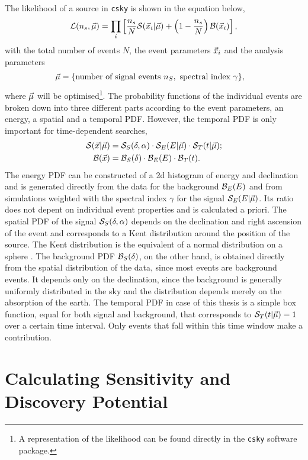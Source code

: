 The likelihood of a source in \texttt{csky} is shown in the equation below,
\begin{equation}
  \mathcal{L}(n_s,\vec{\mu})
  = \prod_i \left[ 
    \frac{n_s}{N} \mathcal{S}(\vec{x}_i|\vec{\mu})
    + \left( 1 - \frac{n_s}{N} \right) \mathcal{B}(\vec{x}_i)
   \right],
  \label{eq:lh}
\end{equation}
with the total number of events $N$, the event parameters $\vec{x}_i$ and the analysis parameters
\begin{align}
  \vec{\mu} &= \{\text{number of signal events }n_S, \text{ spectral index }\gamma\},
\end{align}
where $\vec{\mu}$ will be optimised\footnote{A representation of the likelihood can be found directly in the \texttt{csky} software package.}.
The probability functions of the individual events are broken down into three different parts according to the event parameters, an energy, a spatial and a temporal PDF.
However, the temporal PDF is only important for time-dependent searches,
\begin{align}
  \mathcal{S}(\vec{x}|\vec{\mu})
  &= \mathcal{S}_S(\delta,\alpha)
  \cdot \mathcal{S}_E(E|\vec{\mu})
  \cdot \mathcal{S}_T(t|\vec{\mu});
  \\
  \mathcal{B}(\vec{x})
  &= \mathcal{B}_S(\delta)
  \cdot \mathcal{B}_E(E)
  \cdot \mathcal{B}_T(t).
  \label{eq:pdf}
\end{align}
The energy PDF can be constructed of a 2d histogram of energy and declination and is generated directly from the data for the background $\mathcal{B}_E(E)$ and from simulations weighted with the spectral index $\gamma$ for the signal $\mathcal{S}_E(E|\vec{\mu})$.
Its ratio does not depent on individual event properties and is calculated a priori.
The spatial PDF of the signal $\mathcal{S}_S(\delta,\alpha)$ depends on the declination and right ascension of the event and corresponds to a Kent distribution around the position of the source.
The Kent distribution is the equivalent of a normal distribution on a sphere \cite{kent}.
The background PDF $\mathcal{B}_S(\delta)$, on the other hand, is obtained directly from the spatial distribution of the data, since most events are background events.
It depends only on the declination, since the background is generally uniformly distributed in the sky and the distribution depends merely on the absorption of the earth.
The temporal PDF in case of this thesis is a simple box function, equal for both signal and background, that corresponds to $\mathcal{S}_T(t|\vec{\mu})=1$ over a certain time interval.
Only events that fall within this time window make a contribution.

\section{Calculating Sensitivity and Discovery Potential}

